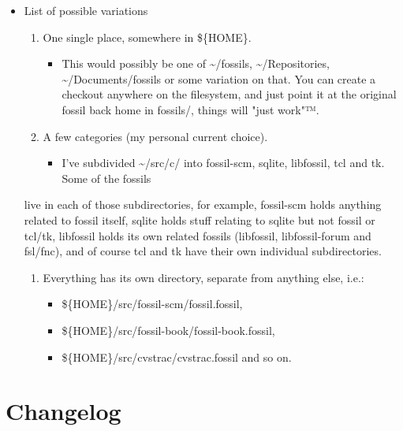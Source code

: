 \documentclass[11pt]{article}
\begin{document}
\begin{itemize}
\item List of possible variations
\label{sec:orgab7f3d6}

\begin{enumerate}
\item One single place, somewhere in \$\{HOME\}.
\begin{itemize}
\item This would possibly be one of \textasciitilde{}/fossils, \textasciitilde{}/Repositories, \textasciitilde{}/Documents/fossils or some variation
on that. You can create a checkout anywhere on the filesystem, and just point it at the original
fossil back home in fossils/, things will "just work"™.
\end{itemize}
\item A few categories (my personal current choice).
\begin{itemize}
\item I've subdivided \textasciitilde{}/src/c/ into fossil-scm, sqlite, libfossil, tcl and tk. Some of the fossils
\end{itemize}
\end{enumerate}
live in each of those subdirectories, for example, fossil-scm holds anything related to fossil
itself, sqlite holds stuff relating to sqlite but not fossil or tcl/tk, libfossil holds its own
related fossils (libfossil, libfossil-forum and fsl/fnc), and of course tcl and tk have their own
individual subdirectories.
\begin{enumerate}
\item Everything has its own directory, separate from anything else, i.e.:
\begin{itemize}
\item \$\{HOME\}/src/fossil-scm/fossil.fossil,
\item \$\{HOME\}/src/fossil-book/fossil-book.fossil,
\item \$\{HOME\}/src/cvstrac/cvstrac.fossil and so on.
\end{itemize}
\end{enumerate}
\end{itemize}

\section*{Changelog}
\label{sec:orgd729168}
\end{document}
